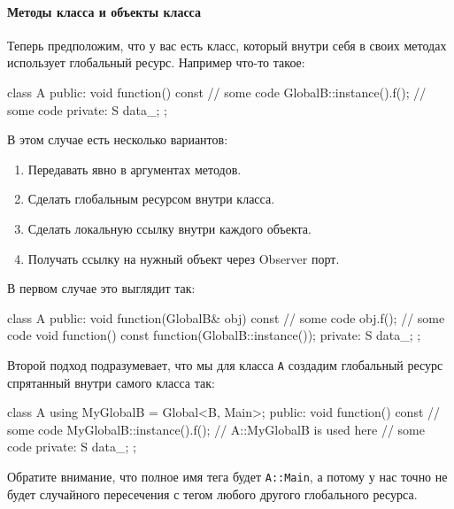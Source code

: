 \paragraph{Методы класса и объекты класса}

Теперь предположим, что у вас есть класс, который внутри себя в своих методах использует глобальный ресурс.
Например что-то такое:
\begin{cppcode}
class A {
public:
  void function() const {
    // some code
    GlobalB::instance().f();
    // some code
  }
private:
  S data_;
};
\end{cppcode}
В этом случае есть несколько вариантов:
\begin{enumerate}
\item Передавать явно в аргументах методов.

\item Сделать глобальным ресурсом внутри класса.

\item Сделать локальную ссылку внутри каждого объекта.

\item Получать ссылку на нужный объект через Observer порт.
\end{enumerate}
В первом случае это выглядит так:
\begin{cppcode}
class A {
public:
  void function(GlobalB& obj) const {
    // some code
    obj.f();
    // some code
  }
  void function() const {
    function(GlobalB::instance());
  }
private:
  S data_;
};
\end{cppcode}
Второй подход подразумевает, что мы для класса \verb"A" создадим глобальный ресурс спрятанный внутри самого класса так:
\begin{cppcode}
class A {
  using MyGlobalB = Global<B, Main>;
public:
  void function() const {
    // some code
    MyGlobalB::instance().f(); // A::MyGlobalB is used here
    // some code
  }
private:
  S data_;
};
\end{cppcode}
Обратите внимание, что полное имя тега будет \verb"A::Main", а потому у нас точно не будет случайного пересечения с тегом любого другого глобального ресурса.


